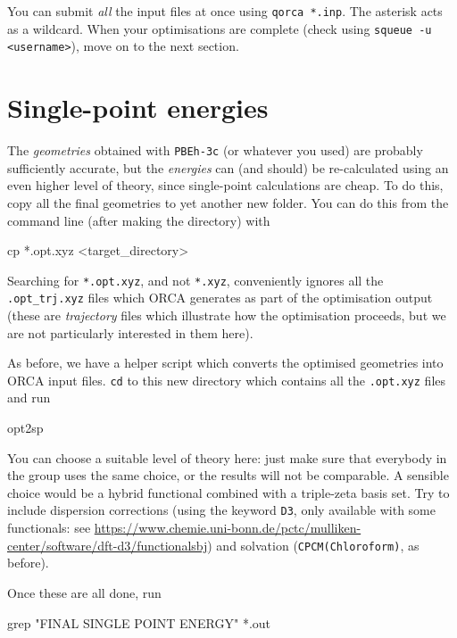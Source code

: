 \documentclass[10pt]{article}
\begin{document}
You can submit \textit{all} the input files at once using \texttt{qorca *.inp}. The asterisk acts as a wildcard. When your optimisations are complete (check using \texttt{squeue -u <username>}), move on to the next section.


\section{Single-point energies}

The \textit{geometries} obtained with \texttt{PBEh-3c} (or whatever you used) are probably sufficiently accurate, but the \textit{energies} can (and should) be re-calculated using an even higher level of theory, since single-point calculations are cheap. To do this, copy all the final geometries to yet another new folder. You can do this from the command line (after making the directory) with

\begin{cmdline}
cp *.opt.xyz <target_directory>
\end{cmdline}

Searching for \texttt{*.opt.xyz}, and not \texttt{*.xyz}, conveniently ignores all the \texttt{.opt\_trj.xyz} files which ORCA generates as part of the optimisation output (these are \textit{trajectory} files which illustrate how the optimisation proceeds, but we are not particularly interested in them here).

As before, we have a helper script which converts the optimised geometries into ORCA input files. \texttt{cd} to this new directory which contains all the \texttt{.opt.xyz} files and run

\begin{cmdline}
opt2sp
\end{cmdline}

You can choose a suitable level of theory here: just make sure that everybody in the group uses the same choice, or the results will not be comparable. A sensible choice would be a hybrid functional combined with a triple-zeta basis set. Try to include dispersion corrections (using the keyword \texttt{D3}, only available with some functionals: see \url{https://www.chemie.uni-bonn.de/pctc/mulliken-center/software/dft-d3/functionalsbj}) and solvation (\texttt{CPCM(Chloroform)}, as before).

Once these are all done, run

\begin{cmdline}
grep "FINAL SINGLE POINT ENERGY" *.out
\end{cmdline}
\end{document}
